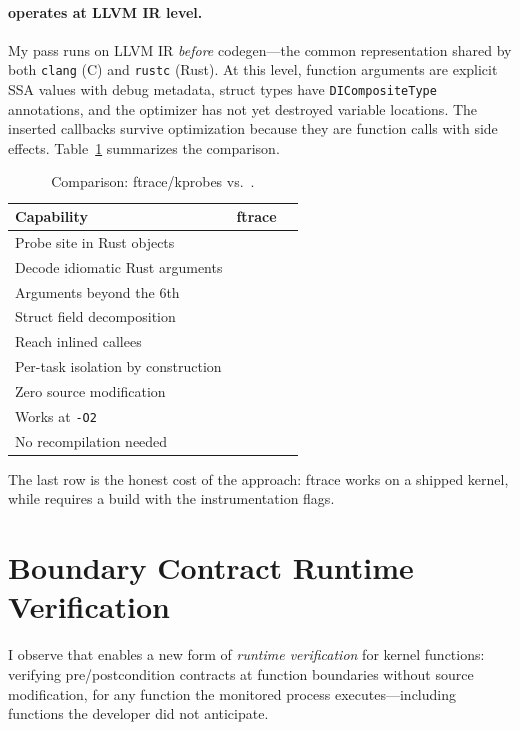 \documentclass{article}
\newcommand{\cmark}{\ding{51}}
\newcommand{\xmark}{\ding{55}}
\begin{document}
\paragraph{\toolname{} operates at LLVM IR level.} My pass runs on LLVM IR
\emph{before} codegen---the common representation shared by both \texttt{clang}
(C) and \texttt{rustc} (Rust). At this level, function arguments are explicit
SSA values with debug metadata, struct types have \texttt{DICompositeType}
annotations, and the optimizer has not yet destroyed variable locations. The
inserted callbacks survive optimization because they are function calls with
side effects. Table~\ref{tab:ftrace} summarizes the comparison.

\begin{table}[t]
\centering
\caption{Comparison: ftrace/kprobes vs.\ \toolname{}.}\label{tab:ftrace}
\small
\begin{tabular}{@{}lcc@{}}
\toprule
\textbf{Capability} & \textbf{ftrace} & \textbf{\toolname{}} \\
\midrule
Probe site in Rust objects & \cmark & \cmark \\
Decode idiomatic Rust arguments & \xmark & \cmark \\
Arguments beyond the 6th & \xmark & \cmark \\
Struct field decomposition & \xmark & \cmark \\
Reach inlined callees & \xmark & \cmark \\
Per-task isolation by construction & \xmark & \cmark \\
Zero source modification & \cmark & \cmark \\
Works at \texttt{-O2} & \cmark & \cmark \\
No recompilation needed & \cmark & \xmark \\
\bottomrule
\end{tabular}
\end{table}

\noindent The last row is the honest cost of the approach: ftrace works on a
shipped kernel, while \toolname{} requires a build with the instrumentation
flags.

\section{Boundary Contract Runtime Verification}\label{sec:contracts}

I observe that \toolname{} enables a new form of \emph{runtime verification}
for kernel functions: verifying pre/postcondition contracts at function
boundaries without source modification, for any function the monitored process
executes---including functions the developer did not anticipate.
\end{document}

